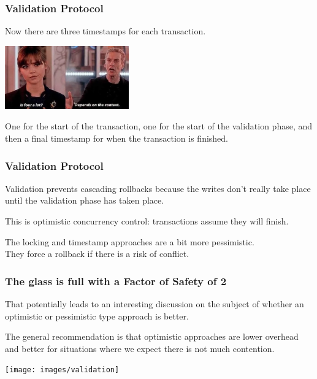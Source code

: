 \begin{frame}
\frametitle{Validation Protocol}

Now there are three timestamps for each transaction. 

\begin{center}
	\includegraphics[width=0.4\textwidth]{images/four-a-lot.jpg}
\end{center}

One for the start of the transaction, one for the start of the validation phase, and then a final timestamp for when the transaction is finished.

\end{frame}

\begin{frame}
\frametitle{Validation Protocol}

Validation prevents cascading rollbacks because the writes don't really take place until the validation phase has taken place.

This is \alert{optimistic concurrency control}: transactions assume they will finish. 

The locking and timestamp approaches are a bit more pessimistic.\\
\quad They force a rollback if there is a risk of conflict.

\end{frame}



\begin{frame}
\frametitle{The glass is full with a Factor of Safety of 2}

That potentially leads to an interesting discussion on the subject of whether an optimistic or pessimistic type approach is better.

The general recommendation is that optimistic approaches are lower overhead and better for situations where we expect there is not much contention.

\begin{center}
	\texttt{[image: images/validation]}
\end{center}

\end{frame}

